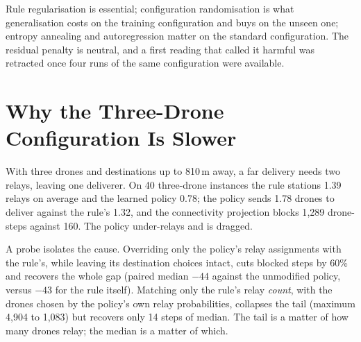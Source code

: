\documentclass[12pt]{article}
\begin{document}
\begin{table}[h]
\centering
\caption{Ablation: completion and mean makespan, two seeds, difference from the full method in
parentheses.}
\label{tab:abl}
\end{table}

Rule regularisation is essential; configuration randomisation is what generalisation costs on
the training configuration and buys on the unseen one; entropy annealing and autoregression
matter on the standard configuration. The residual penalty is neutral, and a first reading that
called it harmful was retracted once four runs of the same configuration were available.

\section{Why the Three-Drone Configuration Is Slower}
\label{sec:diag}

With three drones and destinations up to 810\,m away, a far delivery needs two relays, leaving
one deliverer. On 40 three-drone instances the rule stations 1.39 relays on average and the
learned policy 0.78; the policy sends 1.78 drones to deliver against the rule's 1.32, and the
connectivity projection blocks 1{,}289 drone-steps against 160. The policy under-relays and is
dragged.

A probe isolates the cause. Overriding only the policy's relay assignments with the rule's,
while leaving its destination choices intact, cuts blocked steps by 60\% and recovers the whole
gap (paired median $-44$ against the unmodified policy, versus $-43$ for the rule itself).
Matching only the rule's relay \emph{count}, with the drones chosen by the policy's own relay
probabilities, collapses the tail (maximum 4{,}904 to 1{,}083) but recovers only 14 steps of
median. The tail is a matter of how many drones relay; the median is a matter of which.
\end{document}
